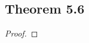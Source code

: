 \documentclass[../../main.tex]{subfiles}
\begin{document}
\subsection{Theorem 5.6}
\begin{wts}

\end{wts}
\begin{proof}

\end{proof}
\end{document}
